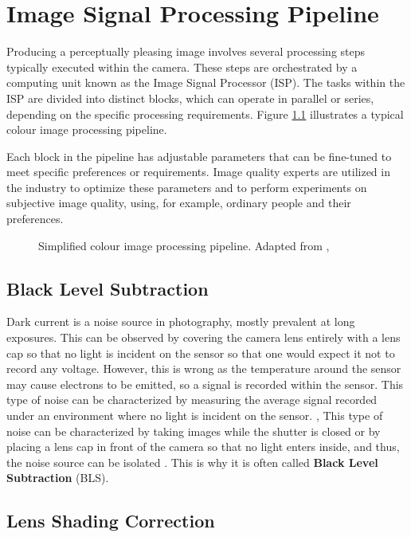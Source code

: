 \chapter{Image Signal Processing Pipeline}%

Producing a perceptually pleasing image involves several processing steps typically executed within the camera. These steps are orchestrated by a computing unit known as the Image Signal Processor (ISP). The tasks within the ISP are divided into distinct blocks, which can operate in parallel or series, depending on the specific processing requirements. Figure \ref{fig:dip} illustrates a typical colour image processing pipeline.

Each block in the pipeline has adjustable parameters that can be fine-tuned to meet specific preferences or requirements. Image quality experts are utilized in the industry to optimize these parameters and to perform experiments on subjective image quality, using, for example, ordinary people and their preferences.

\begin{figure}
\centering

\caption{Simplified colour image processing pipeline. Adapted from \cite{Ramanath}, \cite{JianpingZhou2007IPTf}}
\label{fig:dip}
\end{figure}


\section{Black Level Subtraction}

Dark current is a noise source in photography, mostly prevalent at long exposures. This can be observed by covering the camera lens entirely with a lens cap so that no light is incident on the sensor so that one would expect it not to record any voltage. However, this is wrong as the temperature around the sensor may cause electrons to be emitted, so a signal is recorded within the sensor. This type of noise can be characterized by measuring the average signal recorded under an environment where no light is incident on the sensor. \cite[289]{nakamura}, \cite[63, chapter. 3]{rowlands2020physics} This type of noise can be characterized by taking images while the shutter is closed or by placing a lens cap in front of the camera so that no light enters inside, and thus, the noise source can be isolated \cite{Ramanath}. This is why it is often called \textbf{Black Level Subtraction} (BLS).

\section{Lens Shading Correction}

